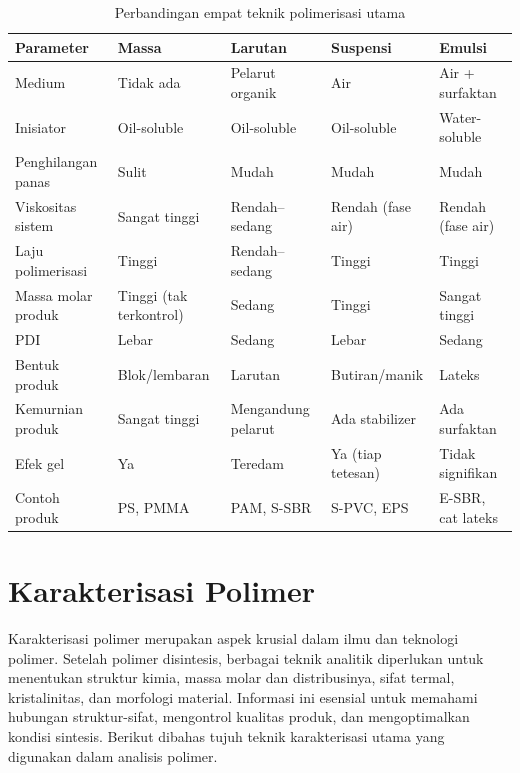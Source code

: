 \documentclass[12pt,a4paper,openany]{book}
\begin{document}
\begin{table}[H]
\centering
\caption{Perbandingan empat teknik polimerisasi utama}
\label{tab:teknik-polimerisasi}
\small
\begin{tabular}{@{}lllll@{}}
\toprule
\textbf{Parameter} & \textbf{Massa} & \textbf{Larutan} & \textbf{Suspensi} & \textbf{Emulsi} \\
\midrule
Medium & Tidak ada & Pelarut organik & Air & Air + surfaktan \\
Inisiator & Oil-soluble & Oil-soluble & Oil-soluble & Water-soluble \\
Penghilangan panas & Sulit & Mudah & Mudah & Mudah \\
Viskositas sistem & Sangat tinggi & Rendah--sedang & Rendah (fase air) & Rendah (fase air) \\
Laju polimerisasi & Tinggi & Rendah--sedang & Tinggi & Tinggi \\
Massa molar produk & Tinggi (tak terkontrol) & Sedang & Tinggi & Sangat tinggi \\
PDI & Lebar & Sedang & Lebar & Sedang \\
Bentuk produk & Blok/lembaran & Larutan & Butiran/manik & Lateks \\
Kemurnian produk & Sangat tinggi & Mengandung pelarut & Ada stabilizer & Ada surfaktan \\
Efek gel & Ya & Teredam & Ya (tiap tetesan) & Tidak signifikan \\
Contoh produk & PS, PMMA & PAM, S-SBR & S-PVC, EPS & E-SBR, cat lateks \\
\bottomrule
\end{tabular}
\end{table}

\section{Karakterisasi Polimer}

Karakterisasi polimer merupakan aspek krusial dalam ilmu dan teknologi polimer. Setelah polimer disintesis, berbagai teknik analitik diperlukan untuk menentukan struktur kimia, massa molar dan distribusinya, sifat termal, kristalinitas, dan morfologi material. Informasi ini esensial untuk memahami hubungan struktur-sifat, mengontrol kualitas produk, dan mengoptimalkan kondisi sintesis. Berikut dibahas tujuh teknik karakterisasi utama yang digunakan dalam analisis polimer.
\end{document}
